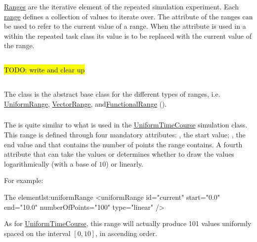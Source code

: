 \hyperref[class:range]{Ranges} are the iterative element of the repeated simulation experiment. Each \hyperref[class:range]{range} defines a collection of values to iterate over. The  attribute of the ranges can be used to refer to the current value of a range. When the  attribute is used in a  within the repeated task class its value is to be replaced with the current value of the range.

\subsection{}
\label{class:subtask}
\hl{TODO: write and clear up}

\subsection{}
\label{class:range}
The  class is the abstract base class for the different types of ranges, i.e. \hyperref[class:uniformRange]{UniformRange}, \hyperref[class:vectorRange]{VectorRange}, and\hyperref[class:functionalRange]{FunctionalRange} (). 


\subsubsection{}
\label{class:uniformRange}
The  is quite similar to what is used in the \hyperref[class:uniformTimeCourse]{UniformTimeCourse} simulation class. This range is defined through four mandatory attributes: , the start value; , the end value and  that contains the number of points the range contains. A fourth attribute  that can take the values  or  determines whether to draw the values logarithmically (with a base of $10$) or linearly.

For example:
\begin{myXmlLst}{The  element}{lst:uniformRange}
<uniformRange id="current" start="0.0" end="10.0" numberOfPoints="100" type="linear" /> 
\end{myXmlLst}
As for \hyperref[class:uniformTimeCourse]{UniformTimeCourse}, this range will actually produce 101 values uniformly spaced on the interval $[0, 10]$, in ascending order.

